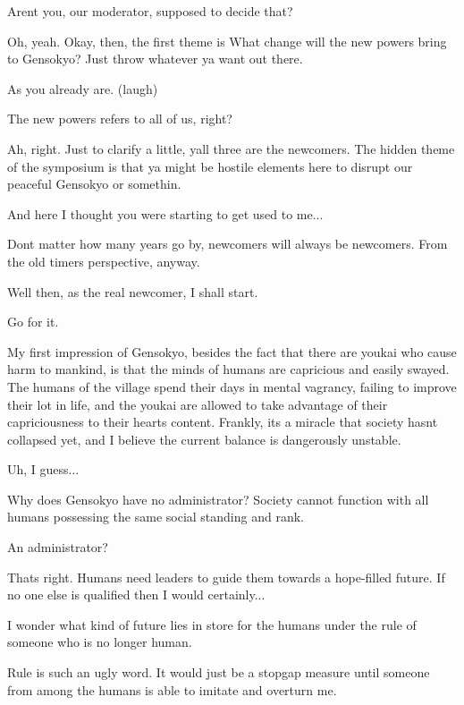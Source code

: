 \begin{tcolorbox}[breakable, colback=white, colframe=black!80,
  boxrule=0.6pt, arc=0mm, left=3mm, right=3mm, top=2mm, bottom=2mm]
\medskip
Aren\textquotesingle{}t you, our moderator, supposed to decide that?\par
\medskip
Oh, yeah. Okay, then, the first theme is \textquotedbl{}What change will the new powers bring to Gensokyo?\textquotedbl{} Just throw whatever ya want out there.\par
\medskip
As you already are. (laugh)\par
\medskip
The \textquotedbl{}new powers\textquotedbl{} refers to all of us, right?\par
\medskip
Ah, right. Just to clarify a little, y\textquotesingle{}all three are the newcomers. The hidden theme of the symposium is that ya might be hostile elements here to disrupt our peaceful Gensokyo or somethin\textquotesingle{}.\par
\medskip
And here I thought you were starting to get used to me...\par
\medskip
Don\textquotesingle{}t matter how many years go by, newcomers will always be newcomers. From the old timers\textquotesingle{} perspective, anyway.\par
\medskip
Well then, as the real newcomer, I shall start.\par
\medskip
Go for it.\par
\medskip
My first impression of Gensokyo, besides the fact that there are youkai who cause harm to mankind, is that the minds of humans are capricious and easily swayed. The humans of the village spend their days in mental vagrancy, failing to improve their lot in life, and the youkai are allowed to take advantage of their capriciousness to their heart\textquotesingle{}s content. Frankly, it\textquotesingle{}s a miracle that society hasn\textquotesingle{}t collapsed yet, and I believe the current balance is dangerously unstable.\par
\medskip
Uh, I guess...\par
\medskip
Why does Gensokyo have no administrator? Society cannot function with all humans possessing the same social standing and rank.\par
\medskip
An administrator?\par
\medskip
That\textquotesingle{}s right. Humans need leaders to guide them towards a hope-{}filled future. If no one else is qualified then I would certainly...\par
\medskip
I wonder what kind of future lies in store for the humans under the rule of someone who is no longer human.\par
\medskip
\textquotedbl{}Rule\textquotedbl{} is such an ugly word. It would just be a stopgap measure until someone from among the humans is able to imitate and overturn me.\par

\end{tcolorbox}
